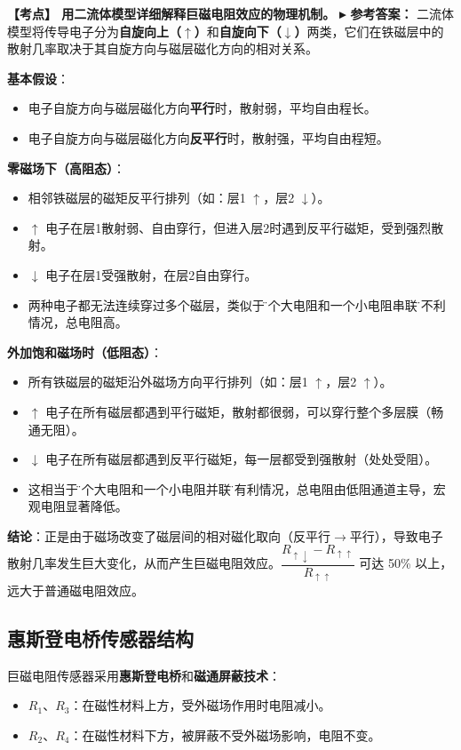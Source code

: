 \documentclass[12pt,a4paper]{article}
\newcommand{\exam}[1]{\textbf{\color{blue!70!black}【考点】#1}}
\newcommand{\answer}[1]{\vspace{2pt}\noindent\textbf{\color{teal!80!black}▸ 参考答案：}#1\vspace{4pt}}
\newcommand{\qa}[2]{\exam{#1}\answer{#2}}
\begin{document}
\qa{
    用二流体模型详细解释巨磁电阻效应的物理机制。
}{
    二流体模型将传导电子分为\textbf{自旋向上（$\uparrow$）}和\textbf{自旋向下（$\downarrow$）}两类，它们在铁磁层中的散射几率取决于其自旋方向与磁层磁化方向的相对关系。

    \noindent\textbf{基本假设}：
    \begin{itemize}
        \item 电子自旋方向与磁层磁化方向\textbf{平行}时，散射弱，平均自由程长。
        \item 电子自旋方向与磁层磁化方向\textbf{反平行}时，散射强，平均自由程短。
    \end{itemize}

    \noindent\textbf{零磁场下（高阻态）}：
    \begin{itemize}
        \item 相邻铁磁层的磁矩反平行排列（如：层1 $\uparrow$，层2 $\downarrow$）。
        \item $\uparrow$ 电子在层1散射弱、自由穿行，但进入层2时遇到反平行磁矩，受到强烈散射。
        \item $\downarrow$ 电子在层1受强散射，在层2自由穿行。
        \item 两种电子都无法连续穿过多个磁层，类似于\"一个大电阻和一个小电阻串联\"的不利情况，总电阻高。
    \end{itemize}

    \noindent\textbf{外加饱和磁场时（低阻态）}：
    \begin{itemize}
        \item 所有铁磁层的磁矩沿外磁场方向平行排列（如：层1 $\uparrow$，层2 $\uparrow$）。
        \item $\uparrow$ 电子在所有磁层都遇到平行磁矩，散射都很弱，可以穿行整个多层膜（畅通无阻）。
        \item $\downarrow$ 电子在所有磁层都遇到反平行磁矩，每一层都受到强散射（处处受阻）。
        \item 这相当于\"一个大电阻和一个小电阻并联\"的有利情况，总电阻由低阻通道主导，宏观电阻显著降低。
    \end{itemize}

    \noindent\textbf{结论}：正是由于磁场改变了磁层间的相对磁化取向（反平行$\to$平行），导致电子散射几率发生巨大变化，从而产生巨磁电阻效应。$\dfrac{R_{\uparrow\downarrow} - R_{\uparrow\uparrow}}{R_{\uparrow\uparrow}}$ 可达 50\% 以上，远大于普通磁电阻效应。
}

\subsection{惠斯登电桥传感器结构}
巨磁电阻传感器采用\textbf{惠斯登电桥}和\textbf{磁通屏蔽技术}：
\begin{itemize}
    \item \(R_1\)、\(R_3\)：在磁性材料上方，受外磁场作用时电阻减小。
    \item \(R_2\)、\(R_4\)：在磁性材料下方，被屏蔽不受外磁场影响，电阻不变。
\end{itemize}
\end{document}
